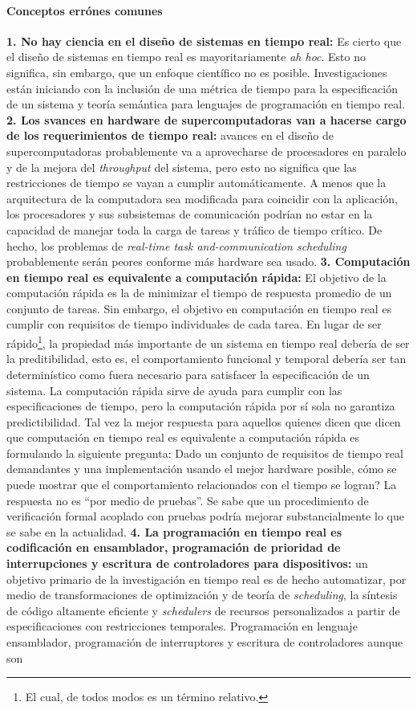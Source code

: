 \paragraph{\textnormal{\textbf{Conceptos errónes comunes}}} \textbf{1. No hay ciencia en el diseño de sistemas en tiempo real:} Es cierto que el diseño de sistemas en tiempo real es mayoritariamente \emph{ah hoc}. Esto no significa, sin embargo, que un enfoque científico no es posible. Investigaciones están iniciando con la inclusión de una métrica de tiempo para la especificación de un sistema y teoría semántica para lenguajes de programación en tiempo real. \textbf{2. Los svances en hardware de supercomputadoras van a hacerse cargo de los requerimientos de tiempo real:} avances en el diseño de supercomputadoras probablemente va a aprovecharse de procesadores en paralelo y de la mejora del \emph{throughput} del sistema, pero esto no significa que las restricciones de tiempo se vayan a cumplir automáticamente. A menos que la arquitectura de la computadora sea modificada para coincidir con la aplicación, los procesadores y sus subsistemas de comunicación podrían no estar en la capacidad de manejar toda la carga de tareas y tráfico de tiempo crítico. De hecho, los problemas de \emph{real-time task and-communication scheduling} probablemente serán peores conforme más hardware sea usado. \textbf{3. Computación en tiempo real es equivalente a computación rápida:} El objetivo de la computación rápida es la de minimizar el tiempo de respuesta promedio de un conjunto de tareas. Sin embargo, el objetivo en computación en tiempo real es cumplir con requisitos de tiempo individuales de cada tarea. En lugar de ser rápido\footnote{El cual, de todos modos es un término relativo.}, la propiedad más importante de un sistema en tiempo real debería de ser la preditibilidad, esto es, el comportamiento funcional y temporal debería ser tan determinístico como fuera necesario para satisfacer la especificación de un sistema. La computación rápida sirve de ayuda para cumplir con las especificaciones de tiempo, pero la computación rápida por sí sola no garantiza predictibilidad. Tal vez la mejor respuesta para aquellos quienes dicen que  dicen que computación en tiempo real es equivalente a computación rápida es formulando la siguiente pregunta: Dado un conjunto de requisitos de tiempo real demandantes y una implementación usando el mejor hardware posible, cómo se puede mostrar que el comportamiento relacionados con el tiempo se logran? La respuesta no es ``por medio de pruebas''. Se sabe que un procedimiento de verificación formal acoplado con pruebas podría mejorar substancialmente lo que se sabe en la actualidad. \textbf{4. La programación en tiempo real es codificación en ensamblador, programación de prioridad de interrupciones y escritura de controladores para dispositivos:} un objetivo primario de la investigación en tiempo real es de hecho automatizar, por medio de transformaciones de optimización y de teoría de \emph{scheduling}, la síntesis de código altamente eficiente y \emph{schedulers} de recursos personalizados a partir de especificaciones con restricciones temporales. Programación en lenguaje ensamblador, programación de interruptores y escritura de controladores aunque son 